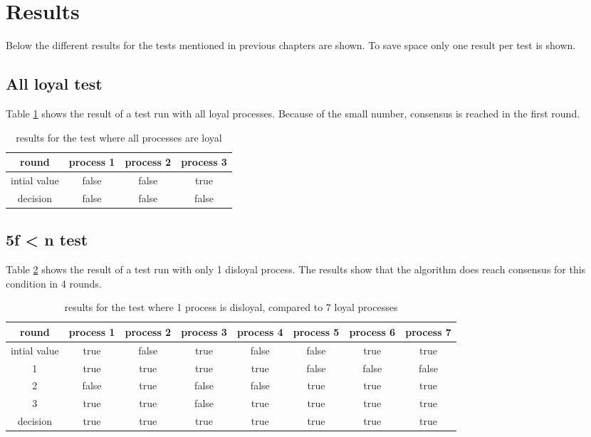 \section{Results}

Below the different results for the tests mentioned in previous chapters are shown. To save space only one result per test is shown.

\subsection{All loyal test}
Table \ref{table:resultsAllLoyal} shows the result of a test run with all loyal processes. Because of the small number, consensus is reached in the first round.


\begin{table}[h]
	\begin{tabular}{ | c | c  | c  | c| }
		\hline
  		round & process 1 & process 2 & process 3 \\
		\hline
 		intial value &  false & false & true  \\
		\hline
  		decision  & false & false & false  \\
		\hline
	\end{tabular}
	\caption{results for the test where all processes are loyal}	
	\label{table:resultsAllLoyal}
\end{table}

\subsection{5f < n test}
Table \ref{table:resultsFewDisloyal} shows the result of a test run with only 1 disloyal process.
The results show that the algorithm does reach consensus for this condition in 4 rounds.


\begin{table}[h]
	\begin{tabular}{ | c | c  | c  | c| c | c | c | c |}
		\hline
  		round & process 1 & process 2 & process 3 & process 4 & process 5 & process 6 & process 7 \\
		\hline
 		intial value &  true & false & true  & false & false & true & true \\
		\hline
		1  &  true & true & true  & true & false & false & false \\
		\hline
		2  &  false & true & false  & false & true & true & true \\
		\hline
		3  &  true & true & false  & true & true & true & true \\
		\hline
  		decision  &  true & true & true  & true & true & true & true  \\
		\hline
	\end{tabular}
	\caption{results for the test where 1 process is disloyal, compared to 7 loyal processes}	
	\label{table:resultsFewDisloyal}
\end{table}

